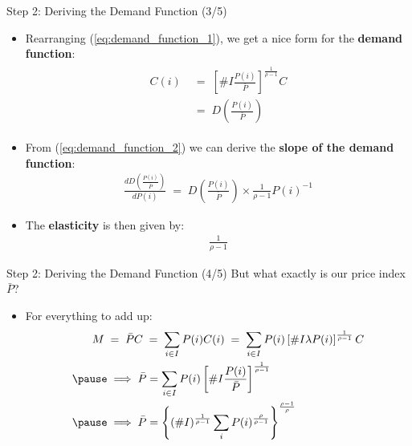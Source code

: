 \documentclass[10pt,c,aspectratio=1610,handout]{beamer}
\begin{document}
\begin{frame}{Step 2: Deriving the Demand Function (3/5)}\label{slide:demand_function}%
  \begin{itemize}%
    \item[$\blacktriangleright$] Rearranging (\ref{eq:demand_function_1}), we get a nice form for the \textbf{demand function}:%
    \begin{align}%
      \begin{split}\label{eq:demand_function_2}%
        C(i) \; & = \; \left[ \#I\frac{P(i)}{\bar{P}}\right]^{\frac{1}{\rho-1}} C \\%
      & = \; D\left( \frac{P(i)}{\bar{P}}\right)%
      \end{split}%
    \end{align}%
    \pause%
    \item[$\blacktriangleright$] From (\ref{eq:demand_function_2}) we can derive the \textbf{slope of the demand function}:%
    \begin{align*}%
      \frac{d D\left( \frac{P(i)}{\bar{P}}\right)}{dP(i)} \; = \; D\left( \frac{P(i)}{\bar{P}}\right) \times \frac{1}{\rho -1}P(i)^{-1}%
    \end{align*}%
    \pause%
    \item[$\blacktriangleright$] The \textbf{elasticity} is then given by:%
    \begin{align*}%
      \frac{1}{\rho -1}%
    \end{align*}%
  \end{itemize}%
\end{frame}%
\begin{frame}{Step 2: Deriving the Demand Function (4/5)}%
  But what exactly is our price index $\bar P$?%
  \pause%
  \begin{itemize}%
    \item[$\blacktriangleright$] For everything to add up:%
    \begin{align}%
      M \; & = \; \bar{P} C \; = \; \sum_{i \in I} P(i) C(i) \; = \; \sum_{i \in I} P(i) \left[\# I \lambda P(i) \right]^{\frac{1}{\rho-1}} C \notag\\%
      \pause%
      & \implies \bar P  = \sum_{i \in I} P(i) \left[\# I \frac{P(i)}{\bar P} \right]^{\frac{1}{\rho-1}} \notag\\%
      \pause%
      & \implies \bar{P}=\left\{ (\#I)^{\frac{1}{\rho-1}}\sum_{i}P(i)^{\frac{\rho }{\rho -1}}\right\}^{\frac{\rho -1}{\rho }}%
    \end{align}%
  \end{itemize}%
\end{frame}%
\end{document}

